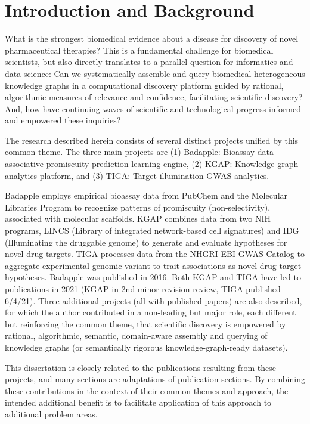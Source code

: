 \chapter{Introduction and Background}

What is the strongest biomedical evidence about a disease for discovery of novel pharmaceutical therapies? This is a fundamental challenge for biomedical scientists, but also directly translates to a parallel question for informatics and data science: Can we systematically assemble and query biomedical heterogeneous knowledge graphs in a computational discovery platform guided by rational, algorithmic measures of relevance and confidence, facilitating scientific discovery? And, how have continuing waves of scientific and technological progress informed and empowered these inquiries? 

The research described herein consists of several distinct projects unified by this common theme. The three main projects are (1) Badapple: Bioassay data associative promiscuity prediction learning engine, (2) KGAP: Knowledge graph analytics platform, and (3) TIGA: Target illumination GWAS analytics. 

Badapple employs empirical bioassay data from PubChem and the Molecular Libraries Program to recognize patterns of promiscuity (non-selectivity), associated with molecular scaffolds. KGAP combines data from two NIH programs, LINCS (Library of integrated network-based cell signatures)  and IDG (Illuminating the druggable genome) to generate and evaluate hypotheses for novel drug targets. TIGA processes data from the NHGRI-EBI GWAS Catalog to aggregate experimental genomic variant to trait associations as novel drug target hypotheses.  Badapple was published in 2016. Both KGAP and TIGA have led to publications in 2021 (KGAP in 2nd minor revision review, TIGA published 6/4/21). Three additional projects (all with published papers) are also described, for which the author contributed in a non-leading but major role, each different but reinforcing the common theme, that scientific discovery is empowered by rational, algorithmic, semantic, domain-aware assembly and querying of knowledge graphs (or semantically rigorous knowledge-graph-ready datasets). 

This dissertation is closely related to the publications resulting from these projects, and many sections are adaptations of publication sections. By combining these contributions in the context of their common themes and approach, the intended additional benefit is to facilitate application of this approach to additional problem areas. 

